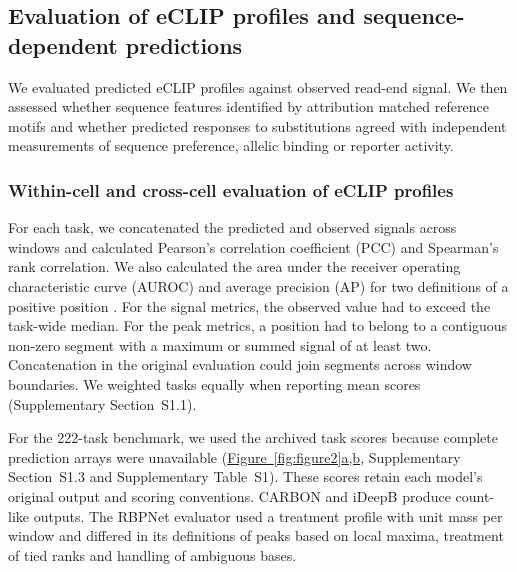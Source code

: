 \documentclass[webpdf,contemporary,large]{current_assets/oup-authoring-template}
\newcommand{\figpanelref}[2]{\hyperref[#1]{Figure~\ref*{#1}#2}}
\newcommand{\suptab}[1]{Supplementary Table~#1}
\newcommand{\supsect}[1]{Supplementary Section~#1}
\begin{document}
\subsection{Evaluation of eCLIP profiles and sequence-dependent predictions}\label{subsec:metrics}

We evaluated predicted eCLIP profiles against observed read-end signal. We then assessed whether sequence features identified by attribution matched reference motifs and whether predicted responses to substitutions agreed with independent measurements of sequence preference, allelic binding or reporter activity.

\subsubsection{Within-cell and cross-cell evaluation of eCLIP profiles}

For each task, we concatenated the predicted and observed signals across windows and calculated Pearson's correlation coefficient (PCC) and Spearman's rank correlation. We also calculated the area under the receiver operating characteristic curve (AUROC) and average precision (AP) for two definitions of a positive position \citep{davis2006prroc,saito2015precision}. For the signal metrics, the observed value had to exceed the task-wide median. For the peak metrics, a position had to belong to a contiguous non-zero segment with a maximum or summed signal of at least two. Concatenation in the original evaluation could join segments across window boundaries. We weighted tasks equally when reporting mean scores (\supsect{S1.1}).

For the 222-task benchmark, we used the archived task scores because complete prediction arrays were unavailable (\figpanelref{fig:figure2}{a,b}, \supsect{S1.3} and \suptab{S1}). These scores retain each model's original output and scoring conventions. CARBON and iDeepB produce count-like outputs. The RBPNet evaluator used a treatment profile with unit mass per window and differed in its definitions of peaks based on local maxima, treatment of tied ranks and handling of ambiguous bases.
\end{document}
